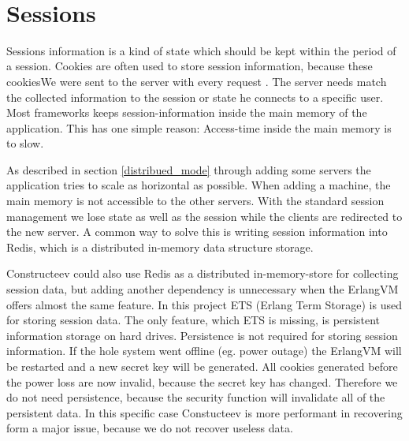 \ \newline

\section{Sessions}
Sessions information is a kind of state which should be kept within the period of a session. Cookies are often used to store session information, because these cookiesWe were sent to the server with every request . The server needs match the collected information to the session or state he connects to a specific user. Most frameworks keeps session-information inside the main memory of the application. This has one simple reason: Access-time inside the main memory is to slow. 

As described in section \ref{distribued_mode} through adding some servers the application tries to scale as horizontal as possible. When adding a machine, the main memory is not accessible to the other servers. With the standard session management we lose state as well as the session while the clients are redirected to the new server.  A common way to solve this is writing session information into Redis, which is a distributed in-memory data structure storage. 

Constructeev could also use Redis as a distributed in-memory-store for collecting session data, but adding another dependency is unnecessary when the ErlangVM offers almost the same feature. In this project ETS (Erlang Term Storage) is used for storing session data. The only feature, which ETS is missing, is persistent information storage on hard drives. Persistence is not required for storing session information. If the hole system went offline (eg. power outage) the ErlangVM will be restarted and a new secret key will be generated. All cookies generated before the power loss are now invalid, because the secret key has changed. Therefore we do not need persistence, because the security function will invalidate all of the persistent data. In this specific case Constucteev is more performant in recovering form a major issue, because we do not recover useless data.

